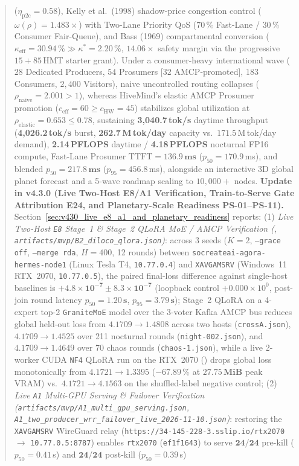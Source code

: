 \documentclass[11pt,a4paper]{article}
\begin{document}
\begin{abstract}
($\eta_{\text{p2c}} = 0.58$), Kelly et al.\ (1998) shadow-price congestion control ($\omega(\rho) = 1.483\times$) with Two-Lane Priority QoS ($70\,\%$ Fast-Lane / $30\,\%$ Consumer Fair-Queue), and Bass (1969) compartmental conversion ($\kappa_{\text{eff}} = 30.94\,\% \gg \kappa^* = 2.20\,\%$, $14.06\times$ safety margin via the progressive $15 + 85$\,HMT starter grant). Under a consumer-heavy international wave ($28$ Dedicated Producers, $54$ Prosumers [$32$ AMCP-promoted], $183$ Consumers, $2{,}400$ Visitors), naive uncontrolled routing collapses ($\rho_{\text{naive}} = 2.001 > 1$), whereas HiveMind's elastic AMCP Prosumer promotion ($c_{\text{eff}} = 60 \ge c_{\text{HW}} = 45$) stabilizes global utilization at \textbf{$\rho_{\text{elastic}} = 0.653 \le 0.78$}, sustaining \textbf{3{,}040.7\,tok/s} daytime throughput (\textbf{4{,}026.2\,tok/s} burst, \textbf{262.7\,M\,tok/day} capacity vs.\ $171.5$\,M\,tok/day demand), \textbf{2.14\,PFLOPS} daytime / \textbf{4.18\,PFLOPS} nocturnal FP16 compute, Fast-Lane Prosumer $\text{TTFT} = \mathbf{136.9\,\text{ms}}$ ($p_{50} = 170.9$\,ms), and blended $p_{50} = \mathbf{217.8\,\text{ms}}$ ($p_{95} = 456.8$\,ms), alongside an interactive 3D global planet forecast and a 5-wave roadmap scaling to $10{,}000+$ nodes. \textbf{Update in v4.3.0 (Live Two-Host E8/A1 Verification, Train-to-Serve Gate Attribution E24, and Planetary-Scale Readiness PS-01--PS-11).} Section~\ref{sec:v430_live_e8_a1_and_planetary_readiness} reports: (1) \emph{Live Two-Host \texttt{E8} Stage~1 \& Stage~2 QLoRA MoE / AMCP Verification (, \texttt{artifacts/mvp/B2\_diloco\_qlora.json})}: across 3 seeds ($K=2$, \texttt{--grace off}, \texttt{--merge rda}, $H=400$, 12 rounds) between \texttt{socreateai-agora-hermes-node1} (Linux Tesla T4, \texttt{10.77.0.4}) and \texttt{XAVGAMSRV} (Windows~11 RTX~2070, \texttt{10.77.0.5}), the paired final-loss difference against single-host baselines is $\mathbf{+4.8\times 10^{-7} \pm 8.3\times 10^{-7}}$ (loopback control $+0.000\times 10^0$, post-join round latency $p_{50} = \mathbf{1.20\,\text{s}}$, $p_{95} = \mathbf{3.79\,\text{s}}$); Stage~2 QLoRA on a 4-expert top-2 \texttt{GraniteMoE} model over the 3-voter Kafka AMCP bus reduces global held-out loss from $\mathbf{4.1709 \to 1.4808}$ across two hosts (\texttt{crossA.json}), $\mathbf{4.1709 \to 1.4525}$ over 211 nocturnal rounds (\texttt{night-002.json}), and $\mathbf{4.1709 \to 1.4649}$ over 70 chaos rounds (\texttt{chaos-1.json}), while a live 2-worker CUDA \texttt{NF4} QLoRA run on the RTX~2070 () drops global loss monotonically from $\mathbf{4.1721 \to 1.3395}$ ($-67.89\,\%$ at $\mathbf{27.75\,\text{MiB}}$ peak VRAM) vs.\ $\mathbf{4.1721 \to 4.1563}$ on the shuffled-label negative control; (2) \emph{Live \texttt{A1} Multi-GPU Serving \& Failover Verification (\texttt{artifacts/mvp/A1\_multi\_gpu\_serving.json}, \texttt{A1\_two\_producer\_wrr\_failover\_live\_2026-11-10.json})}: restoring the \texttt{XAVGAMSRV} WireGuard relay (\texttt{https://34-145-228-3.sslip.io/rtx2070} $\to$ \texttt{10.77.0.5:8787}) enables \texttt{rtx2070} (\texttt{ef1f1643}) to serve $\mathbf{24/24}$ pre-kill ($p_{50}=0.41$\,s) and $\mathbf{24/24}$ post-kill ($p_{50}=0.39$\,s) 
\end{abstract}
\end{document}
